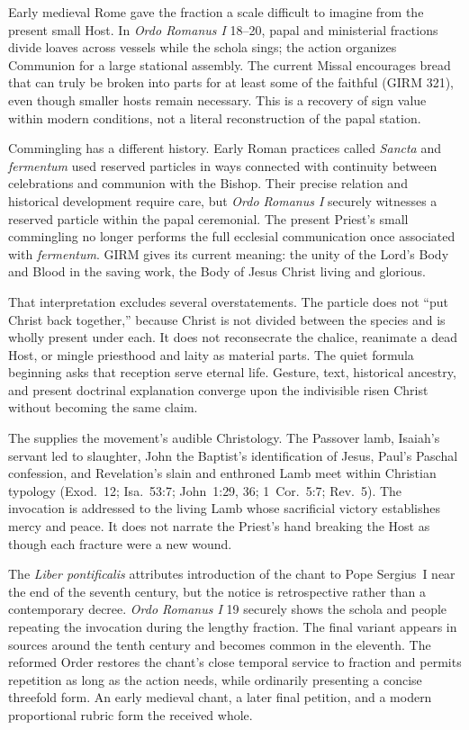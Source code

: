 Early medieval Rome gave the fraction a scale difficult to imagine from the present small Host. In \emph{Ordo Romanus I} 18--20, papal and ministerial fractions divide loaves across vessels while the schola sings; the action organizes Communion for a large stational assembly. The current Missal encourages bread that can truly be broken into parts for at least some of the faithful (GIRM 321), even though smaller hosts remain necessary. This is a recovery of sign value within modern conditions, not a literal reconstruction of the papal station.

Commingling has a different history. Early Roman practices called \emph{Sancta} and \emph{fermentum} used reserved particles in ways connected with continuity between celebrations and communion with the Bishop. Their precise relation and historical development require care, but \emph{Ordo Romanus I} securely witnesses a reserved particle within the papal ceremonial. The present Priest's small commingling no longer performs the full ecclesial communication once associated with \emph{fermentum}. GIRM gives its current meaning: the unity of the Lord's Body and Blood in the saving work, the Body of Jesus Christ living and glorious.

That interpretation excludes several overstatements. The particle does not ``put Christ back together,'' because Christ is not divided between the species and is wholly present under each. It does not reconsecrate the chalice, reanimate a dead Host, or mingle priesthood and laity as material parts. The quiet formula beginning  asks that reception serve eternal life. Gesture, text, historical ancestry, and present doctrinal explanation converge upon the indivisible risen Christ without becoming the same claim.

The  supplies the movement's audible Christology. The Passover lamb, Isaiah's servant led to slaughter, John the Baptist's identification of Jesus, Paul's Paschal confession, and Revelation's slain and enthroned Lamb meet within Christian typology (Exod.~12; Isa.~53:7; John~1:29, 36; 1~Cor.~5:7; Rev.~5). The invocation is addressed to the living Lamb whose sacrificial victory establishes mercy and peace. It does not narrate the Priest's hand breaking the Host as though each fracture were a new wound.

The \emph{Liber pontificalis} attributes introduction of the chant to Pope Sergius~I near the end of the seventh century, but the notice is retrospective rather than a contemporary decree. \emph{Ordo Romanus I} 19 securely shows the schola and people repeating the invocation during the lengthy fraction. The final variant  appears in sources around the tenth century and becomes common in the eleventh. The reformed Order restores the chant's close temporal service to fraction and permits repetition as long as the action needs, while ordinarily presenting a concise threefold form. An early medieval chant, a later final petition, and a modern proportional rubric form the received whole.

